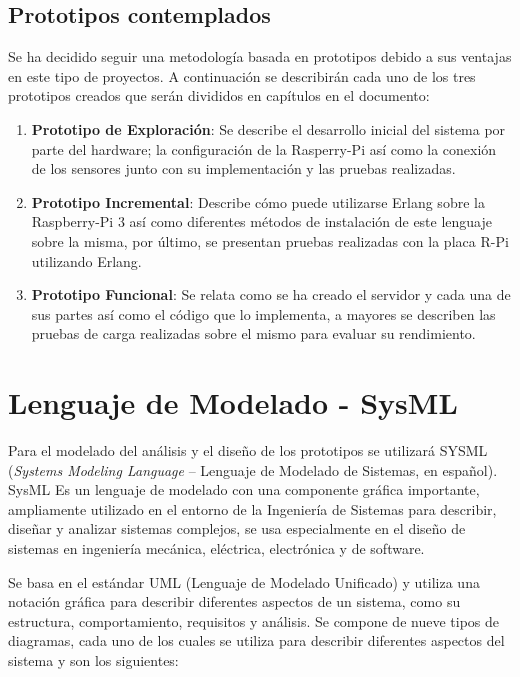 \subsection{Prototipos contemplados}

Se ha decidido seguir una metodología basada en prototipos debido a sus ventajas en este tipo de proyectos. A continuación se describirán cada uno de los tres prototipos creados que serán divididos en capítulos en el documento:

\begin{enumerate}
   \item \textbf{Prototipo de Exploración}: Se describe el desarrollo inicial del sistema por parte del hardware; la configuración de la Rasperry-Pi así como la conexión de los sensores junto con su implementación y las pruebas realizadas.
    \item \textbf{Prototipo Incremental}: Describe cómo puede utilizarse Erlang sobre la Raspberry-Pi 3 así como diferentes métodos de instalación de este lenguaje sobre la misma, por último, se presentan pruebas realizadas con la placa R-Pi utilizando Erlang.
    \item \textbf{Prototipo Funcional}: Se relata como se ha creado el servidor y cada una de sus partes así como el código que lo implementa, a mayores se describen las pruebas de carga realizadas sobre el mismo para evaluar su rendimiento.

    
\end{enumerate}
\section{Lenguaje de Modelado - SysML}

Para el modelado del análisis y el diseño de los prototipos se utilizará SYSML (\emph{Systems Modeling Language} -- Lenguaje de Modelado de Sistemas, en español). SysML Es un lenguaje de modelado con una componente gráfica importante, ampliamente utilizado en el entorno de la Ingeniería de Sistemas para describir, diseñar y analizar sistemas complejos, se usa especialmente en el diseño de sistemas en ingeniería mecánica, eléctrica, electrónica y de software.

Se basa en el estándar UML (Lenguaje de Modelado Unificado) y utiliza una notación gráfica para describir diferentes aspectos de un sistema, como su estructura, comportamiento, requisitos y análisis. Se compone de nueve tipos de diagramas, cada uno de los cuales se utiliza para describir diferentes aspectos del sistema y son los siguientes:

